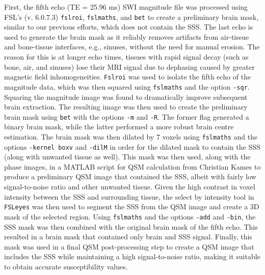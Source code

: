 \documentclass[
true
]{sn-jnl}
\begin{document}
First, the fifth echo (TE = 25.96 ms) SWI magnitude file was processed
using FSL's (v. 6.0.7.3)
\citep{woolrichBayesianAnalysisNeuroimaging2009} \texttt{fslroi},
\texttt{fslmaths}, and \texttt{bet} \citep{smithFastRobustAutomated2002}
to create a preliminary brain mask, similar to our previous efforts,
which does not contain the SSS. The last echo is used to generate the
brain mask as it reliably removes artifacts from air-tissue and
bone-tissue interfaces, e.g., sinuses, without the need for manual
erosion. The reason for this is at longer echo times, tissues with rapid
signal decay (such as bone, air, and sinuses) lose their MRI signal due
to dephasing caused by greater magnetic field inhomogeneities.
\texttt{Fslroi} was used to isolate the fifth echo of the magnitude
data, which was then squared using \texttt{fslmaths} and the option
\texttt{-sqr}. Squaring the magnitude image was found to dramatically
improve subsequent brain extraction. The resulting image was then used
to create the preliminary brain mask using \texttt{bet} with the options
\texttt{-m} and \texttt{-R}. The former flag generated a binary brain
mask, while the latter performed a more robust brain centre estimation.
The brain mask was then dilated by 7 voxels using \texttt{fslmaths} and
the options \texttt{-kernel\ boxv} and \texttt{-dilM} in order for the
dilated mask to contain the SSS (along with unwanted tissue as well).
This mask was then used, along with the phase images, in a MATLAB script
for QSM calculation from Christian Kames
\citep{kamesRapidTwostepDipole2018} to produce a preliminary QSM image
that contained the SSS, albeit with fairly low signal-to-noise ratio and
other unwanted tissue. Given the high contrast in voxel intensity
between the SSS and surrounding tissue, the select by intensity tool in
\texttt{FSLeyes} \citep{mccarthyFSLeyes2023} was then used to segment
the SSS from the QSM image and create a 3D mask of the selected region.
Using \texttt{fslmaths} and the options \texttt{-add} and \texttt{-bin},
the SSS mask was then combined with the original brain mask of the fifth
echo. This resulted in a brain mask that contained only brain and SSS
signal. Finally, this mask was used in a final QSM post-processing step
to create a QSM image that includes the SSS while maintaining a high
signal-to-noise ratio, making it suitable to obtain accurate
susceptibility values.
\end{document}
